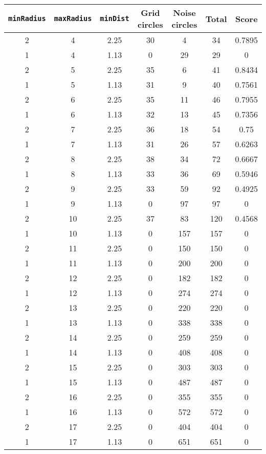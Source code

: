 \documentclass[letterpaper, 12pt]{article}
\begin{document}
\begin{longtable}{|c|c|c|c|c|c|c|}
\hline
\textbf{\texttt{minRadius}} & \textbf{\texttt{maxRadius}} & \textbf{\texttt{minDist}} & \textbf{Grid circles} & \textbf{Noise circles} & \textbf{Total} & \textbf{Score} \\
\hline
2 & 4 & 2.25 & 30 & 4 & 34 & 0.7895 \\
\hline
1 & 4 & 1.13 & 0 & 29 & 29 & 0 \\
\hline
2 & 5 & 2.25 & 35 & 6 & 41 & 0.8434 \\
\hline
1 & 5 & 1.13 & 31 & 9 & 40 & 0.7561 \\
\hline
2 & 6 & 2.25 & 35 & 11 & 46 & 0.7955 \\
\hline
1 & 6 & 1.13 & 32 & 13 & 45 & 0.7356 \\
\hline
2 & 7 & 2.25 & 36 & 18 & 54 & 0.75 \\
\hline
1 & 7 & 1.13 & 31 & 26 & 57 & 0.6263 \\
\hline
2 & 8 & 2.25 & 38 & 34 & 72 & 0.6667 \\
\hline
1 & 8 & 1.13 & 33 & 36 & 69 & 0.5946 \\
\hline
2 & 9 & 2.25 & 33 & 59 & 92 & 0.4925 \\
\hline
1 & 9 & 1.13 & 0 & 97 & 97 & 0 \\
\hline
2 & 10 & 2.25 & 37 & 83 & 120 & 0.4568 \\
\hline
1 & 10 & 1.13 & 0 & 157 & 157 & 0 \\
\hline
2 & 11 & 2.25 & 0 & 150 & 150 & 0 \\
\hline
1 & 11 & 1.13 & 0 & 200 & 200 & 0 \\
\hline
2 & 12 & 2.25 & 0 & 182 & 182 & 0 \\
\hline
1 & 12 & 1.13 & 0 & 274 & 274 & 0 \\
\hline
2 & 13 & 2.25 & 0 & 220 & 220 & 0 \\
\hline
1 & 13 & 1.13 & 0 & 338 & 338 & 0 \\
\hline
2 & 14 & 2.25 & 0 & 259 & 259 & 0 \\
\hline
1 & 14 & 1.13 & 0 & 408 & 408 & 0 \\
\hline
2 & 15 & 2.25 & 0 & 303 & 303 & 0 \\
\hline
1 & 15 & 1.13 & 0 & 487 & 487 & 0 \\
\hline
2 & 16 & 2.25 & 0 & 355 & 355 & 0 \\
\hline
1 & 16 & 1.13 & 0 & 572 & 572 & 0 \\
\hline
2 & 17 & 2.25 & 0 & 404 & 404 & 0 \\
\hline
1 & 17 & 1.13 & 0 & 651 & 651 & 0 \\

\end{longtable}
\end{document}
